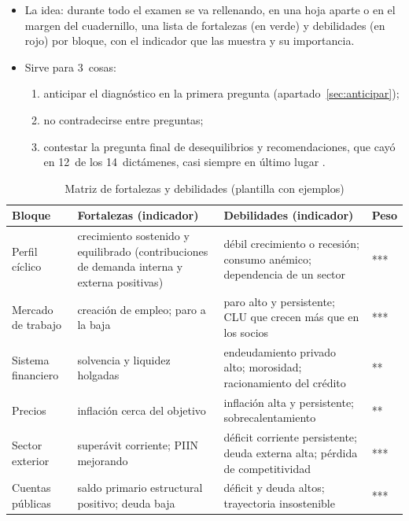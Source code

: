\documentclass[11pt]{article}
\begin{document}
\begin{itemize}
\item La idea: durante todo el examen se va rellenando, en una hoja aparte o en el margen del cuadernillo, una lista de fortalezas (en verde) y debilidades (en rojo) por bloque, con el indicador que las muestra y su importancia.
\item Sirve para 3~cosas:
  \begin{enumerate}
  \item anticipar el diagnóstico en la primera pregunta (apartado~\ref{sec:anticipar});
  \item no contradecirse entre preguntas;
  \item contestar la pregunta final de desequilibrios y recomendaciones, que cayó en 12~de los 14~dictámenes, casi siempre en último lugar \parencite{ATCEE2026Examenes}.
  \end{enumerate}
\end{itemize}

\begin{table}[H]
\centering\small
\caption{Matriz de fortalezas y debilidades (plantilla con ejemplos)}\label{tab:matriz}
\begin{tabular}{>{\raggedright\arraybackslash}p{2.4cm}>{\raggedright\arraybackslash}p{4.6cm}>{\raggedright\arraybackslash}p{4.6cm}>{\centering\arraybackslash}p{1.8cm}}
\toprule
\rowcolor{tceeazulpalido}
\textbf{Bloque} & \textbf{\textcolor{tceeverde}{Fortalezas} (indicador)} & \textbf{\textcolor{tceerojo}{Debilidades} (indicador)} & \textbf{Peso} \\
\midrule
Perfil cíclico & crecimiento sostenido y equilibrado (contribuciones de demanda interna y externa positivas) & débil crecimiento o recesión; consumo anémico; dependencia de un sector & *** \\
Mercado de trabajo & creación de empleo; paro a la baja & paro alto y persistente; CLU que crecen más que en los socios & *** \\
Sistema financiero & solvencia y liquidez holgadas & endeudamiento privado alto; morosidad; racionamiento del crédito & ** \\
Precios & inflación cerca del objetivo & inflación alta y persistente; sobrecalentamiento & ** \\
Sector exterior & superávit corriente; PIIN mejorando & déficit corriente persistente; deuda externa alta; pérdida de competitividad & *** \\
Cuentas públicas & saldo primario estructural positivo; deuda baja & déficit y deuda altos; trayectoria insostenible & *** \\
\bottomrule
\end{tabular}
\end{table}
\end{document}

